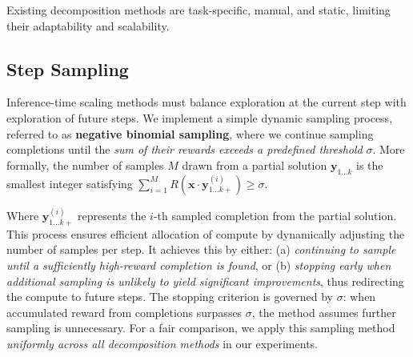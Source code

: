 


\begin{tcolorbox}[title=Problem: Automatic and scalable decomposition, colframe=low, boxsep=0.5mm]
\footnotesize{
    Existing decomposition methods are task-specific, manual, and static, limiting their adaptability and scalability. %
    }
\end{tcolorbox}

\vskip -0.2in
\subsection{Step Sampling}

Inference-time scaling methods must balance exploration at the current step with exploration of future steps. We implement a simple dynamic sampling process, referred to as \textbf{negative binomial sampling}, where we continue sampling completions until the \emph{sum of their rewards exceeds a predefined threshold} $\sigma$. More formally, the number of samples $M$ drawn from a partial solution $\boldsymbol{y}_{1...k}$ is the smallest integer satisfying $\sum_{i=1}^M R(\boldsymbol{x} \cdot \boldsymbol{y}_{1...k+}^{(i)}) \geq \sigma$.

Where $\boldsymbol{y}_{1...k+}^{(i)}$ represents the $i$-th sampled completion from the partial solution. This process ensures efficient allocation of compute by dynamically adjusting the number of samples per step. It achieves this by either:  
(a) \emph{continuing to sample until a sufficiently high-reward completion is found}, or  
(b) \emph{stopping early when additional sampling is unlikely to yield significant improvements}, thus redirecting the compute to future steps. The stopping criterion is governed by $\sigma$: when accumulated reward from completions surpasses $\sigma$, the method assumes further sampling is unnecessary. For a fair comparison, we apply this sampling method \emph{uniformly across all decomposition methods} in our experiments.


